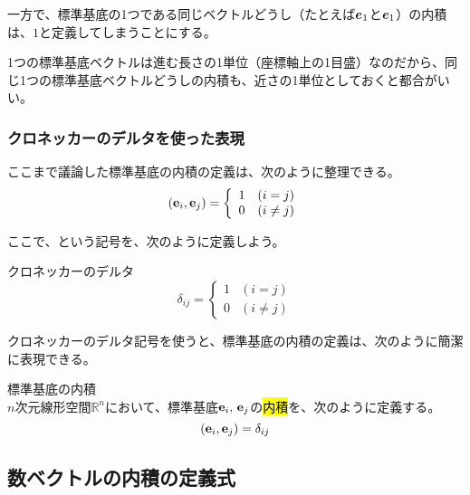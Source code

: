 \documentclass[../../imaging-math]{subfiles}
\begin{document}
\br

一方で、標準基底の1つである同じベクトルどうし（たとえば$\vb*{e}_1$と$\vb*{e}_1$）の内積は、$1$と定義してしまうことにする。

1つの標準基底ベクトルは進む長さの1単位（座標軸上の1目盛）なのだから、同じ1つの標準基底ベクトルどうしの内積も、近さの1単位としておくと都合がいい。

\subsubsection{クロネッカーのデルタを使った表現}

ここまで議論した標準基底の内積の定義は、次のように整理できる。
\begin{equation*}
  (\vb{e}_i, \vb{e}_j) =
  \left\{
  \begin{array}{ll}
    1 & (i = j)    \\
    0 & (i \neq j)
  \end{array}
  \right.
\end{equation*}

ここで、という記号を、次のように定義しよう。

\begin{definition}{クロネッカーのデルタ}
  \Large
  \begin{equation*}
    \delta_{ij} =
    \left\{
    \begin{array}{ll}
      1 & (i = j)    \\
      0 & (i \neq j)
    \end{array}
    \right.
  \end{equation*}
\end{definition}

クロネッカーのデルタ記号を使うと、標準基底の内積の定義は、次のように簡潔に表現できる。

\begin{definition}{標準基底の内積}\quad\\
  $n$次元線形空間$\mathbb{R}^n$において、標準基底$\vb{e}_i,\, \vb{e}_j$の\hl{内積}を、次のように定義する。
  \Large
  \begin{equation*}
    (\vb{e}_i, \vb{e}_j) = \delta_{ij}
  \end{equation*}
\end{definition}

\subsection{数ベクトルの内積の定義式}
\end{document}
